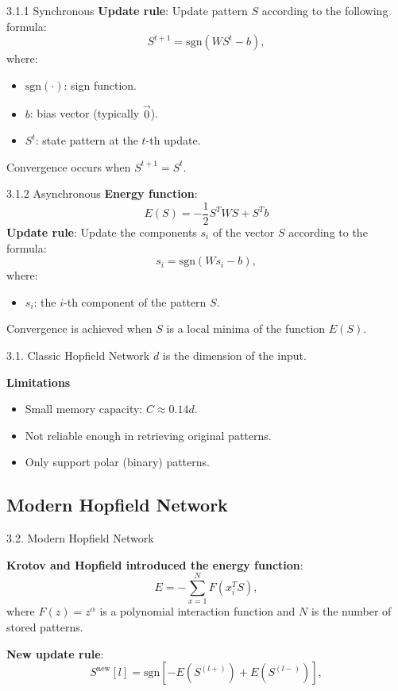 \documentclass[11pt, aspectratio=169]{beamer}
\begin{document}
\begin{frame}{3.1.1 Synchronous}
\textbf{Update rule}: Update pattern \( S \) according to the following formula:
\[
S^{t+1} = \text{sgn}(W S^t - b),
\]
where:
\begin{itemize}
    \item \(\text{sgn}(\cdot)\): sign function.
    \item \( b \): bias vector (typically \( \vec{0} \)).
    \item \( S^t \): state pattern at the \( t \)-th update.
\end{itemize}
Convergence occurs when \( S^{t+1} = S^t \).

\end{frame}

\begin{frame}{3.1.2 Asynchronous}
\textbf{Energy function}:
\[
E(S) = -\frac{1}{2} S^T W S + S^T b
\]
\textbf{Update rule}: Update the components \( s_i \) of the vector \( S \) according to the formula:
\[
s_i = \text{sgn}(W s_i - b),
\]
where:
\begin{itemize}
    \item \( s_i \): the \( i \)-th component of the pattern \( S \).
\end{itemize}
Convergence is achieved when \( S \) is a local minima of the function \( E(S) \).

\end{frame}

\begin{frame}{3.1. Classic Hopfield Network \cite{Hopfield:2007}}
    \( d \) is the dimension of the input.
    
\textbf{Limitations}

\begin{itemize}
    \item Small memory capacity: $C \approx 0.14d$.
    \item Not reliable enough in retrieving original patterns.
    \item Only support polar (binary) patterns.
\end{itemize}
\end{frame}

\subsection{Modern Hopfield Network}
\begin{frame}{3.2. Modern Hopfield Network}

\textbf{Krotov and Hopfield introduced the energy function}:
\[
E = -\sum_{x=1}^N F(x_i^T S),
\]
where $F(z) = z^\alpha$ is a polynomial interaction function and \( N \) is the number of stored patterns.

\textbf{New update rule}:
\[
S^{\text{new}}[l] = \text{sgn} \left[ -E(S^{(l+)}) + E(S^{(l-)}) \right],
\]
\end{frame}
\end{document}
